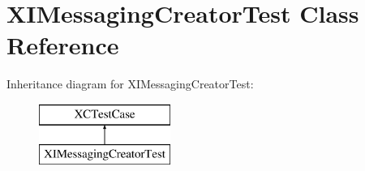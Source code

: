\hypertarget{interface_x_i_messaging_creator_test}{}\section{X\+I\+Messaging\+Creator\+Test Class Reference}
\label{interface_x_i_messaging_creator_test}
Inheritance diagram for X\+I\+Messaging\+Creator\+Test\+:\begin{figure}[H]
\begin{center}
\leavevmode
\includegraphics[height=2.000000cm]{interface_x_i_messaging_creator_test}
\end{center}
\end{figure}
